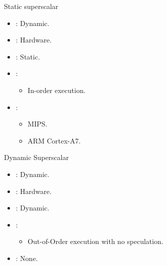 \begin{frame}[t]{Static superscalar}
\begin{itemize}
  \item {}: Dynamic.
  \item {}: Hardware.
  \item {}: Static.
  \item {}:
    \begin{itemize}
      \item In-order execution.
    \end{itemize}
  
  \item {}:
    \begin{itemize}
      \item MIPS.
      \item ARM Cortex-A7.
    \end{itemize}
\end{itemize}
\end{frame}

\begin{frame}[t]{Dynamic Superscalar}
\begin{itemize}
  \item {}: Dynamic.
  \item {}: Hardware.
  \item {}: Dynamic.
  \item {}:
    \begin{itemize}
      \item Out-of-Order execution with no speculation.
    \end{itemize}
  
  \item {}: None.
\end{itemize}
\end{frame}

